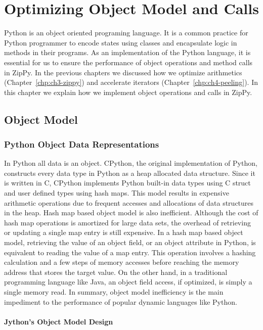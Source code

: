 \chapter{Optimizing Object Model and Calls}
\label{chp:ch5-object}

Python is an object oriented programing language.
It is a common practice for Python programmer to encode states using classes and encapsulate logic in methods in their programs.
As an implementation of the Python language, it is essential for us to ensure the performance of object operations and method calls in ZipPy.
In the previous chapters we discussed how we optimize arithmetics (Chapter~\ref{chp:ch3-zippy}) and accelerate iterators (Chapter~\ref{chp:ch4-peeling}).
In this chapter we explain how we implement object operations and calls in ZipPy.

\section{Object Model}
\label{sec:ch5-object-module}

\subsection{Python Object Data Representations}

In Python all data is an object.
CPython, the original implementation of Python, constructs every data type in Python as a heap allocated data structure.
Since it is written in C, CPython implements Python built-in data types using C struct and user defined types using hash maps.
This model results in expensive arithmetic operations due to frequent accesses and allocations of data structures in the heap.
Hash map based object model is also inefficient.
Although the cost of hash map operations is amortized for large data sets, the overhead of retrieving or updating a single map entry is still expensive.
In a hash map based object model, retrieving the value of an object field, or an object attribute in Python, is equivalent to reading the value of a map entry.
This operation involves a hashing calculation and a few steps of memory accesses before reaching the memory address that stores the target value.
On the other hand, in a traditional programming language like Java, an object field access, if optimized, is simply a single memory read.
In summary, object model inefficiency is the main impediment to the performance of popular dynamic languages like Python.

\subsubsection{Jython's Object Model Design}

